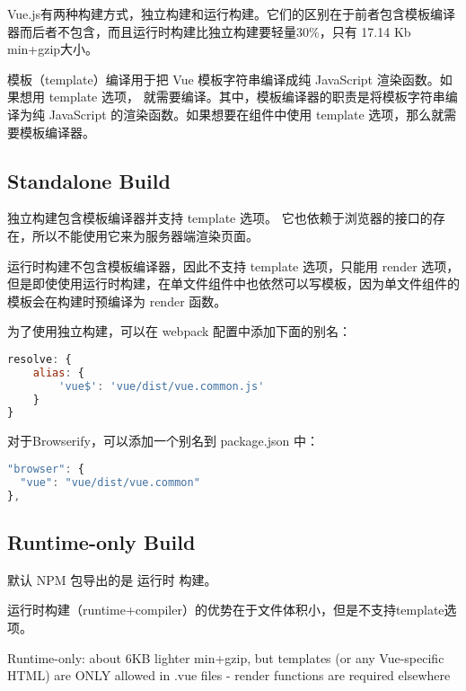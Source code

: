 Vue.js有两种构建方式，独立构建和运行构建。它们的区别在于前者包含模板编译器而后者不包含，而且运行时构建比独立构建要轻量30\%，只有 17.14 Kb min+gzip大小。


模板（template）编译用于把 Vue 模板字符串编译成纯 JavaScript 渲染函数。如果想用 template 选项， 就需要编译。其中，模板编译器的职责是将模板字符串编译为纯 JavaScript 的渲染函数。如果想要在组件中使用 template 选项，那么就需要模板编译器。


\subsection{Standalone Build}





\begin{compactitem}
\item 独立构建包含模板编译器并支持 template 选项。 它也依赖于浏览器的接口的存在，所以不能使用它来为服务器端渲染页面。
\item 运行时构建不包含模板编译器，因此不支持 template 选项，只能用 render 选项，但是即使使用运行时构建，在单文件组件中也依然可以写模板，因为单文件组件的模板会在构建时预编译为 render 函数。
\end{compactitem}






为了使用独立构建，可以在 webpack 配置中添加下面的别名：

\begin{lstlisting}[language=JavaScript]
resolve: {
    alias: {
        'vue$': 'vue/dist/vue.common.js'
    }
}
\end{lstlisting}

对于Browserify，可以添加一个别名到 package.json 中：

\begin{lstlisting}[language=JavaScript]
"browser": {
  "vue": "vue/dist/vue.common"
},
\end{lstlisting}



\subsection{Runtime-only Build}


默认 NPM 包导出的是 运行时 构建。

运行时构建（runtime+compiler）的优势在于文件体积小，但是不支持template选项。

Runtime-only: about 6KB lighter min+gzip, but templates (or any Vue-specific HTML) are ONLY allowed in .vue files - render functions are required elsewhere 


